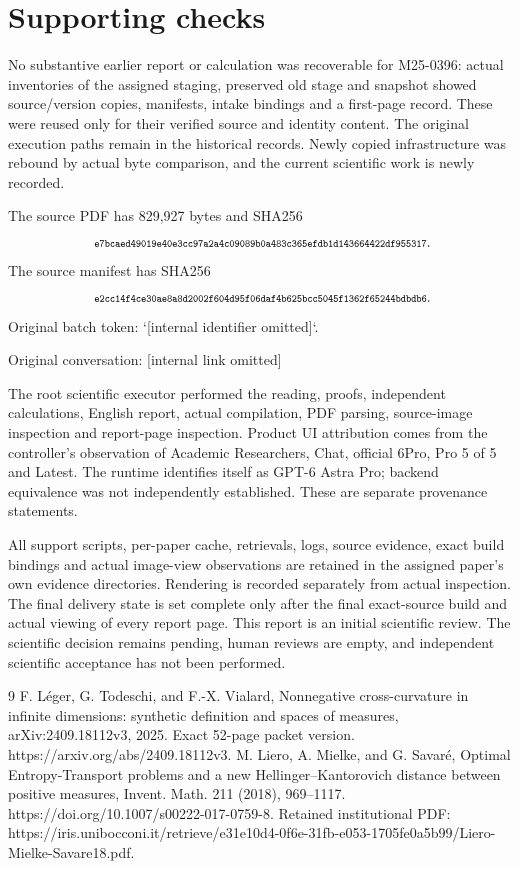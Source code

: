 \documentclass[10pt]{article}
\begin{document}
\section*{Supporting checks}
No substantive earlier report or calculation was recoverable for M25-0396: actual inventories of the assigned staging, preserved old stage and snapshot showed source/version copies, manifests, intake bindings and a first-page record. These were reused only for their verified source and identity content. The original execution paths remain in the historical records. Newly copied infrastructure was rebound by actual byte comparison, and the current scientific work is newly recorded.\par
The source PDF has 829,927 bytes and SHA256 \[\text{\scriptsize\texttt{ e7bcaed49019e40e3cc97a2a4c09089b0a483c365efdb1d143664422df955317}}.\] The source manifest has SHA256 \[\text{\scriptsize\texttt{ e2cc14f4ce30ae8a8d2002f604d95f06daf4b625bcc5045f1362f65244bdbdb6}}.\] Original batch token: `[internal identifier omitted]`.\par
Original conversation: [internal link omitted]\par
The root scientific executor performed the reading, proofs, independent calculations, English report, actual compilation, PDF parsing, source-image inspection and report-page inspection. Product UI attribution comes from the controller’s observation of Academic Researchers, Chat, official 6Pro, Pro 5 of 5 and Latest. The runtime identifies itself as GPT-6 Astra Pro; backend equivalence was not independently established. These are separate provenance statements.\par
All support scripts, per-paper cache, retrievals, logs, source evidence, exact build bindings and actual image-view observations are retained in the assigned paper’s own evidence directories. Rendering is recorded separately from actual inspection. The final delivery state is set complete only after the final exact-source build and actual viewing of every report page. This report is an initial scientific review. The scientific decision remains pending, human reviews are empty, and independent scientific acceptance has not been performed.\par
9 F. Léger, G. Todeschi, and F.-X. Vialard, Nonnegative cross-curvature in infinite dimensions: synthetic definition and spaces of measures, arXiv:2409.18112v3, 2025. Exact 52-page packet version. https://arxiv.org/abs/2409.18112v3. M. Liero, A. Mielke, and G. Savaré, Optimal Entropy-Transport problems and a new Hellinger–Kantorovich distance between positive measures, Invent. Math. 211 (2018), 969–1117. https://doi.org/10.1007/s00222-017-0759-8. Retained institutional PDF: https://iris.unibocconi.it/retrieve/e31e10d4-0f6e-31fb-e053-1705fe0a5b99/Liero-Mielke-Savare18.pdf.\par
\end{document}
